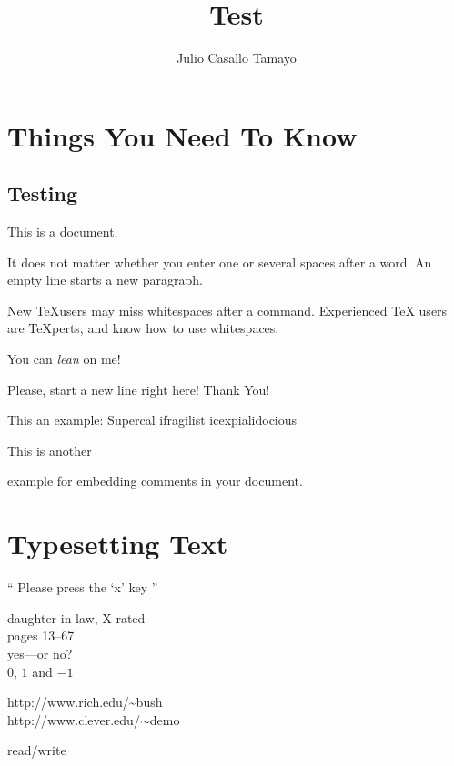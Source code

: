 \documentclass[a4paper,11pt]{book}
\title{Test}
\author{Julio Casallo Tamayo}
\begin{document}
  \maketitle

  \tableofcontents

  \chapter{Things You Need To Know}

  \section{Testing}
  This is a document.

  It does not matter whether you enter one or   several    
  spaces after a word.
  An empty line starts a new paragraph.

  New \TeX users may miss whitespaces after a command.
  Experienced \TeX{} users are \TeX perts, and know how to
  use whitespaces. %

  You can \textsl{lean} on me!

  Please, start a new line right here! \newline 
  Thank You!

  This an %
  example: Supercal%
              ifragilist%
        icexpialidocious

  This is another \begin{comment}
    rather stupid, 
    but helpful
  \end{comment}
  example for embedding comments in your document.

  

  \chapter{Typesetting Text}

  `` Please press the `x' key ''

  daughter-in-law, X-rated\\
  pages 13--67\\
  yes---or no?\\
  $0$, $1$ and $-1$

  http://www.rich.edu/\~{}bush \\
  http://www.clever.edu/$\sim$demo

  read\slash write
\end{document}
